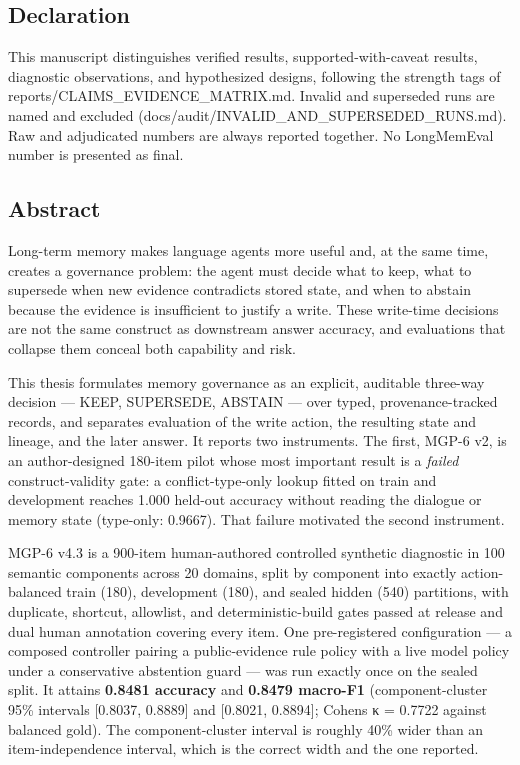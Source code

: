 \subsection{Declaration}\label{declaration}

This manuscript distinguishes verified results, supported-with-caveat
results, diagnostic observations, and hypothesized designs, following
the strength tags of reports/CLAIMS\_EVIDENCE\_MATRIX.md. Invalid and
superseded runs are named and excluded
(docs/audit/INVALID\_AND\_SUPERSEDED\_RUNS.md). Raw and adjudicated
numbers are always reported together. No LongMemEval number is presented
as final.

\subsection{Abstract}\label{abstract}

Long-term memory makes language agents more useful and, at the same
time, creates a governance problem: the agent must decide what to keep,
what to supersede when new evidence contradicts stored state, and when
to abstain because the evidence is insufficient to justify a write.
These write-time decisions are not the same construct as downstream
answer accuracy, and evaluations that collapse them conceal both
capability and risk.

This thesis formulates memory governance as an explicit, auditable
three-way decision --- KEEP, SUPERSEDE, ABSTAIN --- over typed,
provenance-tracked records, and separates evaluation of the write
action, the resulting state and lineage, and the later answer. It
reports two instruments. The first, MGP-6 v2, is an author-designed
180-item pilot whose most important result is a \emph{failed}
construct-validity gate: a conflict-type-only lookup fitted on train and
development reaches 1.000 held-out accuracy without reading the dialogue
or memory state (type-only: 0.9667). That failure motivated the second
instrument.

MGP-6 v4.3 is a 900-item human-authored controlled synthetic diagnostic
in 100 semantic components across 20 domains, split by component into
exactly action-balanced train (180), development (180), and sealed
hidden (540) partitions, with duplicate, shortcut, allowlist, and
deterministic-build gates passed at release and dual human annotation
covering every item. One pre-registered configuration --- a composed
controller pairing a public-evidence rule policy with a live model
policy under a conservative abstention guard --- was run exactly once on
the sealed split. It attains \textbf{0.8481 accuracy} and \textbf{0.8479
macro-F1} (component-cluster 95\% intervals {[}0.8037, 0.8889{]} and
{[}0.8021, 0.8894{]}; Cohen\textquotesingle s κ = 0.7722 against
balanced gold). The component-cluster interval is roughly 40\% wider
than an item-independence interval, which is the correct width and the
one reported.

